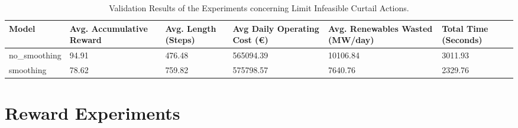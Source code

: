 \begin{table}[ht]
	\centering
	\begin{tabularx}{\textwidth}{|l|X|X|X|X|X|}
		\hline
		\textbf{Model} & \textbf{Avg. Accumulative Reward}& \textbf{Avg. Length (Steps)} & \textbf{Avg Daily Operating Cost (€)} & \textbf{Avg. Renewables Wasted (MW/day)} & \textbf{Total Time (Seconds)}\\
		\hline
		no\_smoothing & 94.91 & 476.48 & 565094.39 & 10106.84 & 3011.93 \\
		smoothing & 78.62 & 759.82 & 575798.57 & 7640.76 & 2329.76 \\
		\hline
	\end{tabularx}
	\caption{Validation Results of the Experiments concerning Limit Infeasible Curtail Actions.}
	\label{fig:curtail-val}
\end{table}

\section{Reward Experiments}

